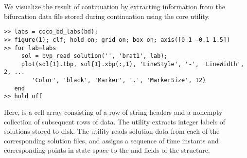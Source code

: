 We visualize the result of continuation by extracting information from the bifurcation data file stored during continuation using the  core utility.
\begin{lstlisting}[language=coco-highlight]
>> labs = coco_bd_labs(bd);
>> figure(1); clf; hold on; grid on; box on; axis([0 1 -0.1 1.5])
>> for lab=labs
     sol = bvp_read_solution('', 'brat1', lab);
     plot(sol{1}.tbp, sol{1}.xbp(:,1), 'LineStyle', '-', 'LineWidth', 2, ...
        'Color', 'black', 'Marker', '.', 'MarkerSize', 12)
   end
>> hold off
\end{lstlisting}
Here,  is a cell array consisting of a row of string headers and a nonempty collection of subsequent rows of data. The  utility extracts integer labels of solutions stored to disk. The  utility reads solution data from each of the corresponding solution files, and assigns a sequence of time instants and corresponding points in state space to the  and  fields of the  structure.

